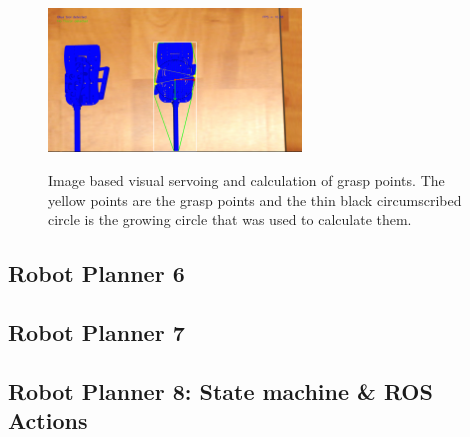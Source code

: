 \begin{center}
\begin{figure}[H]
\centering
\includegraphics[width=0.6\textwidth]{images/grasp-points-triangle.png}\\
\caption{Image based visual servoing and calculation of grasp points. The yellow points are the grasp points and the thin black circumscribed circle is the growing circle that was used to calculate them.}
\end{figure}
\end{center}

\subsection{Robot Planner 6}

\subsection{Robot Planner 7}

\subsection{Robot Planner 8: State machine \& ROS Actions}